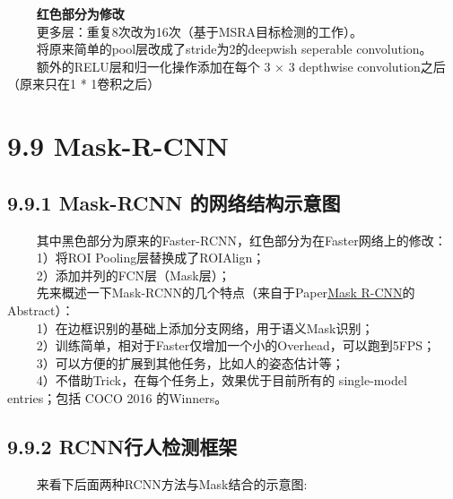 \begin{figure}
\centering
\end{figure}

   \textbf{红色部分为修改}\\
   更多层：重复8次改为16次（基于MSRA目标检测的工作）。\\
   将原来简单的pool层改成了stride为2的deepwish seperable convolution。\\
   额外的RELU层和归一化操作添加在每个 3 × 3 depthwise
convolution之后（原来只在1 * 1卷积之后）

\section{9.9 Mask-R-CNN}\label{mask-r-cnn}

\subsection{9.9.1 Mask-RCNN
的网络结构示意图}\label{mask-rcnn-ux7684ux7f51ux7edcux7ed3ux6784ux793aux610fux56fe}

\begin{figure}
\centering
\end{figure}

   其中黑色部分为原来的Faster-RCNN，红色部分为在Faster网络上的修改：\\
   1）将ROI Pooling层替换成了ROIAlign；\\
   2）添加并列的FCN层（Mask层）；\\
  
先来概述一下Mask-RCNN的几个特点（来自于Paper\href{https://arxiv.org/pdf/1703.06870.pdf}{Mask
R-CNN}的Abstract）：\\
   1）在边框识别的基础上添加分支网络，用于语义Mask识别；\\
   2）训练简单，相对于Faster仅增加一个小的Overhead，可以跑到5FPS；\\
   3）可以方便的扩展到其他任务，比如人的姿态估计等；\\
   4）不借助Trick，在每个任务上，效果优于目前所有的 single-model
entries；包括 COCO 2016 的Winners。

\subsection{9.9.2
RCNN行人检测框架}\label{rcnnux884cux4ebaux68c0ux6d4bux6846ux67b6}

   来看下后面两种RCNN方法与Mask结合的示意图:

